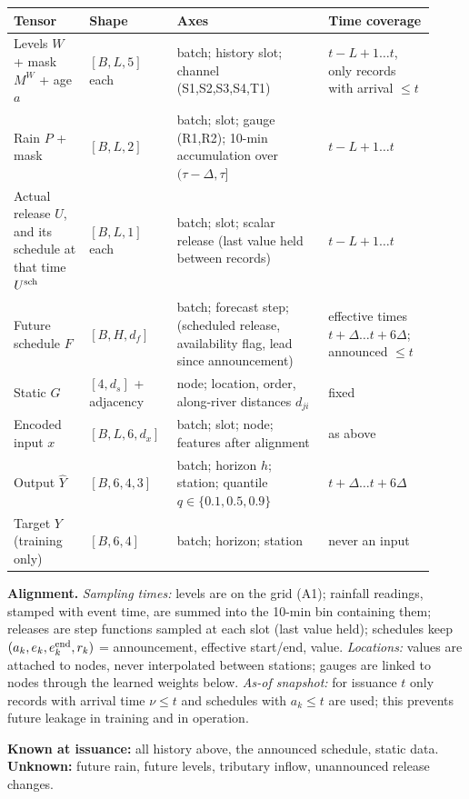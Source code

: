 \small
\begin{center}
\begin{tabular}{@{}p{0.17\linewidth}p{0.17\linewidth}p{0.34\linewidth}p{0.24\linewidth}@{}}
\toprule
\textbf{Tensor} & \textbf{Shape} & \textbf{Axes} & \textbf{Time coverage}\\ \midrule
Levels $W$ + mask $M^W$ + age $a$ & $[B,L,5]$ each & batch; history slot; channel (S1,S2,S3,S4,T1) & $t-L+1\ldots t$, only records with arrival $\le t$\\
Rain $P$ + mask & $[B,L,2]$ & batch; slot; gauge (R1,R2); 10-min accumulation over $(\tau-\Delta,\tau]$ & $t-L+1\ldots t$\\
Actual release $U$, and its schedule at that time $U^{\rm sch}$ & $[B,L,1]$ each & batch; slot; scalar release (last value held between records) & $t-L+1\ldots t$\\
Future schedule $F$ & $[B,H,d_f]$ & batch; forecast step; (scheduled release, availability flag, lead since announcement) & effective times $t+\Delta\ldots t+6\Delta$; announced $\le t$\\
Static $G$ & $[4,d_s]$ + adjacency & node; location, order, along-river distances $d_{ji}$ & fixed\\
Encoded input $x$ & $[B,L,6,d_x]$ & batch; slot; node; features after alignment & as above\\
Output $\hat Y$ & $[B,6,4,3]$ & batch; horizon $h$; station; quantile $q\in\{0.1,0.5,0.9\}$ & $t+\Delta\ldots t+6\Delta$\\
Target $Y$ (training only) & $[B,6,4]$ & batch; horizon; station & never an input\\
\bottomrule
\end{tabular}
\end{center}
\normalsize

\noindent\textbf{Alignment.} \emph{Sampling times:} levels are on the grid (A1); rainfall readings, stamped with event time, are summed
into the 10-min bin containing them; releases are step functions sampled at each slot (last value held); schedules keep
$(a_k,e_k,e_k^{\rm end},r_k)$ = announcement, effective start/end, value. \emph{Locations:} values are attached to nodes, never interpolated between
stations; gauges are linked to nodes through the learned weights below. \emph{As-of snapshot:} for issuance $t$ only records with arrival
time $\nu\le t$ and schedules with $a_k\le t$ are used; this prevents future leakage in training and in operation.

\noindent\textbf{Known at issuance:} all history above, the announced schedule, static data. \textbf{Unknown:} future rain, future levels,
tributary inflow, unannounced release changes.

